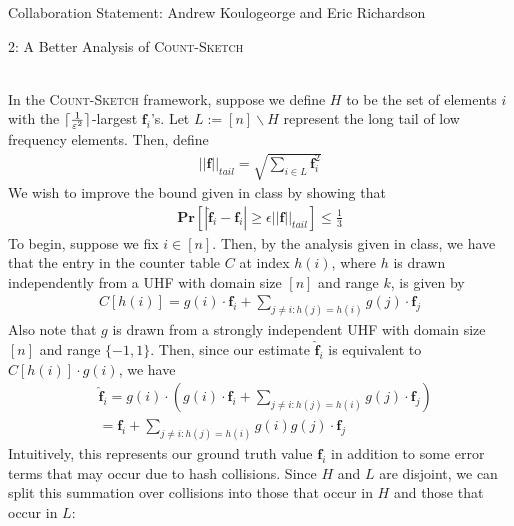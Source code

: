 \documentclass[12pt]{article}
\DeclarePairedDelimiter\ceil{\lceil}{\rceil}
\begin{document}

Collaboration Statement: Andrew Koulogeorge and Eric Richardson 

\begin{problem}{2: A Better Analysis of \textsc{Count-Sketch}}
    
\end{problem}
\begin{solution} \ \\
    In the \textsc{Count-Sketch} framework, suppose we define $H$ to be the set of elements $i$ with the $\ceil{\frac{1}{\epsilon^2}}$-largest $\textbf{f}_i$'s. Let $L := [n] \backslash H$ represent the long tail of low frequency elements. Then, define
    \begin{align*}
        ||\textbf{f}||_{tail} = \sqrt{\sum\limits_{i \in L}\textbf{f}_i^2}
    \end{align*}
    We wish to improve the bound given in class by showing that 
    \begin{align*}
        \textbf{Pr}[|\hat{\textbf{f}}_i - \textbf{f}_i| \geq \epsilon ||\textbf{f}||_{tail}] \leq \frac{1}{3}
    \end{align*}
    To begin, suppose we fix $i \in [n]$. Then, by the analysis given in class, we have that the entry in the counter table $C$ at index $h(i)$, where $h$ is drawn independently from a UHF with domain size $[n]$ and range $k$, is given by
    \begin{align*}
        C[h(i)] = g(i) \cdot \textbf{f}_i + \sum\limits_{j \neq i:h(j) = h(i)} g(j) \cdot \textbf{f}_j
    \end{align*}
    Also note that $g$ is drawn from a strongly independent UHF with domain size $[n]$ and range $\{-1, 1\}$. Then, since our estimate $\hat{\textbf{f}}_i$ is equivalent to $C[h(i)] \cdot g(i)$, we have
    \begin{align*}
        &\hat{\textbf{f}}_i = g(i) \cdot (g(i) \cdot \textbf{f}_i + \sum\limits_{j \neq i:h(j) = h(i)} g(j) \cdot \textbf{f}_j)\\
        &= \textbf{f}_i + \sum\limits_{j \neq i:h(j) = h(i)} g(i)g(j) \cdot \textbf{f}_j 
    \end{align*}
    Intuitively, this represents our ground truth value $\textbf{f}_i$ in addition to some error terms that may occur due to hash collisions. Since $H$ and $L$ are disjoint, we can split this summation over collisions into those that occur in $H$ and those that occur in $L$:
    \begin{align*}

\end{align*}
\end{solution}
\end{document}
